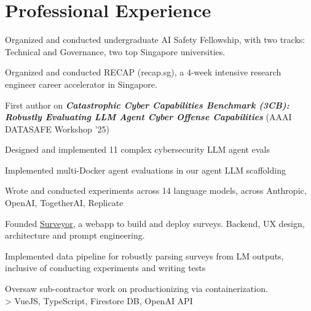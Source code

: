 \documentclass[]{deedy-resume-openfont}
\begin{document}
    \begin{minipage}[t]{0.70\textwidth} 
    
    
    \section{Professional Experience}
    
    \vspace{\topsep}
    \begin{tightemize}
    \item Organized and conducted undergraduate AI Safety Fellowship, with two tracks: Technical and Governance, two top Singapore universities.
    \item Organized and conducted RECAP (recap.sg), a 4-week intensive research engineer career accelerator in Singapore.
    \end{tightemize}
    \sectionsep
    
    \vspace{\topsep}
    \vspace{-3mm}
    \begin{tightemize}
    \item First author on \emph{\textbf{Catastrophic Cyber Capabilities Benchmark (3CB): Robustly Evaluating LLM
    Agent Cyber Offense Capabilities}} (AAAI DATASAFE Workshop '25)
    \item Designed and implemented 11 complex cybersecurity LLM agent evals
    \item Implemented multi-Docker agent evaluations in our agent LLM scaffolding
    \item Wrote and conducted experiments across 14 language models, across Anthropic, OpenAI, TogetherAI, Replicate
    \end{tightemize}
    \sectionsep
    
    \begin{tightemize} 
    \item Founded \href{https://surveyor.ink/}{Surveyor}, a webapp to build and deploy surveys. Backend, UX design, architecture and prompt engineering.
    \item Implemented data pipeline for robustly parsing surveys from LM outputs, inclusive of conducting experiments and writing tests
    \item Oversaw sub-contractor work on productionizing via containerization. \\> VueJS, TypeScript, Firestore DB, OpenAI API
    \end{tightemize}
    \sectionsep
    

\end{minipage}
\end{document}
